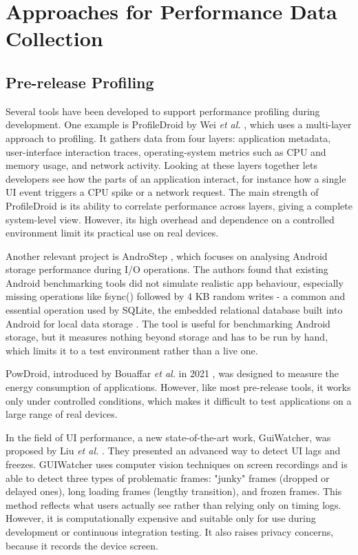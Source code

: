 \section{Approaches for Performance Data Collection}
\subsection{Pre-release Profiling}

Several tools have been developed to support performance profiling during development. One example is
ProfileDroid by Wei \emph{et al.} \cite{ProfileDroid}, which uses a multi-layer approach to profiling. It gathers data from four layers: application metadata, user-interface interaction traces, operating-system metrics such as CPU and memory usage, and network activity. Looking at these layers together lets developers see how the parts of an application interact, for instance how a single UI event triggers a CPU spike or a network request. The main strength of ProfileDroid is
its ability to correlate performance across layers, giving a complete system-level view. However, its high overhead and
dependence on a controlled environment limit its practical use on real devices.

Another relevant project is AndroStep \cite{AndroStep}, which focuses on analysing Android storage performance during
I/O operations. The authors found that existing Android benchmarking tools did not simulate realistic app behaviour,
especially missing operations like fsync() followed by 4 KB random writes - a common and essential operation used by
SQLite, the embedded relational database built into Android for local data storage \cite{AndroStep}. The tool is useful for benchmarking Android storage, but it measures nothing beyond storage and has to be run by hand, which limits it to a test environment rather than a live one.

PowDroid, introduced by Bouaffar \emph{et al.} in 2021 \cite{PowDroid}, was designed to measure the energy consumption
of applications. However, like most pre-release tools, it works only under controlled conditions, which makes it
difficult to test applications on a large range of real devices.

In the field of UI performance, a new state-of-the-art work, GuiWatcher, was proposed by Liu \emph{et al.}
\cite{GuiWatcher}. They presented an advanced way to detect UI lags and freezes. GUIWatcher uses computer vision
techniques on screen recordings and is able to detect three types of problematic frames: "junky" frames (dropped or
delayed ones), long loading frames (lengthy transition), and frozen frames. This method reflects what users actually see
rather than relying only on timing logs. However, it is computationally expensive and suitable only for use during
development or continuous integration testing. It also raises privacy concerns, because it records the device screen.

